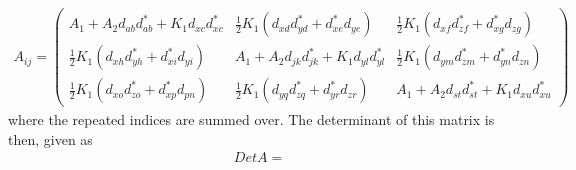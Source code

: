 \documentclass[prl,notitlepage,aps]{revtex4-1}
\begin{document}
\begin{align}
A_{ij}=
\begin{pmatrix}
A_1+A_2 d_{ab}d_{ab}^*+K_1d_{xc}d_{xc}^* & \frac{1}{2}K_1\left(d_{xd}d_{yd}^*+d_{xe}^*d_{ye}\right)& \frac{1}{2}K_1\left(d_{xf}d_{zf}^*+d_{xg}^*d_{zg}\right)\\
\frac{1}{2}K_1\left(d_{xh}d_{yh}^*+d_{xi}^*d_{yi}\right)& A_1+A_2 d_{jk}d_{jk}^*+K_1d_{yl}d_{yl}^* & \frac{1}{2}K_1\left(d_{ym}d_{zm}^*+d_{yn}^*d_{zn}\right)\\
\frac{1}{2}K_1\left(d_{xo}d_{zo}^*+d_{xp}^*d_{pn}\right)&\frac{1}{2}K_1\left(d_{yq}d_{zq}^*+d_{yr}^*d_{zr}\right)&A_1+A_2 d_{st}d_{st}^*+K_1d_{xu}d_{xu}^*
\end{pmatrix}
\end{align}
where the repeated indices are summed over. The determinant of this matrix is then, given as 
\begin{align}
DetA = 
\end{align} 


\end{document}

